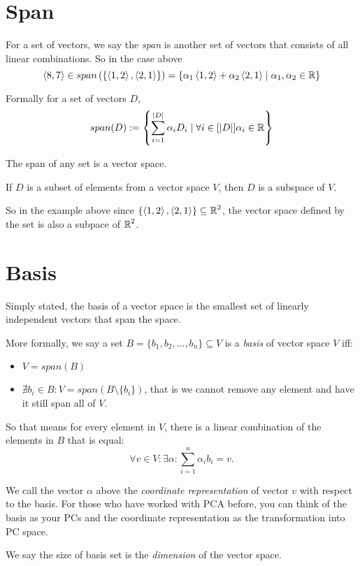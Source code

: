\section{Span}
For a set of vectors, we say the \emph{span} is another set of vectors that consists of all linear combinations. 
So in the case above
\[
\langle8,7\rangle \in span\left(\left\{\left\langle1,2\right\rangle,\left\langle2,1\right\rangle\right\}\right) = 
\left\{\alpha_1\left\langle1,2\right\rangle + \alpha_2\left\langle2,1\right\rangle \mid \alpha_1,\alpha_2 \in \operatorname{\mathbb{R}}\right\}
\]

Formally for a set of vectors $D$, 
\[
span(D) := \left\{\sum_{i=1}^{|D|} \alpha_iD_i \mid \forall i \in [|D|]\alpha_i \in \operatorname{\mathbb{R}} \right\}
\]

The span of any set is a vector space. 

If $D$ is a subset of elements from a vector space $V$, then $D$ is a subspace of $V$. 

So in the example above since $\left\{\left\langle1,2\right\rangle,\left\langle2,1\right\rangle\right\}\subseteq\operatorname{\mathbb{R}}^2$,
the vector space defined by the set is also a subpace of $\operatorname{\mathbb{R}}^2$.

\section{Basis}
Simply stated, the basis of a vector space is the smallest set of linearly independent vectors that span the space. 

More formally, we say a set $B=\{b_1,b_2,...,b_n\} \subseteq V$ is a \emph{basis} of vector space $V$ iff:
\begin{itemize}
\item $V = span(B)$
\item $\nexists b_i\in B : V = span(B\setminus\{b_i\})$, that is we cannot remove any element and have it still span all of $V$.
\end{itemize}

So that means for every element in $V$, there is a linear combination of the elements in $B$ that is equal:
\[\forall v \in V : \exists \alpha : \sum_{i=1}^n \alpha_ib_i = v.\]

We call the vector $\alpha$ above the \emph{coordinate representation} of vector $v$ with respect to the basis. 
For those who have worked with PCA before, you can think of the basis as your PCs and the coordinate representation as the transformation into PC space. 

We say the size of basis set is the \emph{dimension} of the vector space. 

